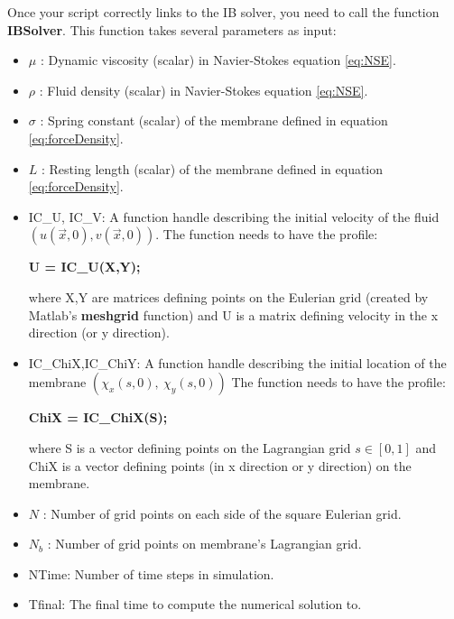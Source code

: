 \documentclass{article}
\begin{document}
Once your script correctly links to the IB solver, you need to call the function {\bf IBSolver}. This function takes several parameters as input:
\begin{itemize}
\item $\mu$ : Dynamic viscosity (scalar) in Navier-Stokes equation \eqref{eq:NSE}.
\item $\rho$ : Fluid density (scalar) in Navier-Stokes equation \eqref{eq:NSE}.
\item $\sigma$ : Spring constant (scalar) of the membrane defined in equation \eqref{eq:forceDensity}.
\item $L$ : Resting length (scalar) of the membrane defined in equation \eqref{eq:forceDensity}.

\item IC\_U, IC\_V: A function handle describing the initial velocity of the fluid $(u(\vec{x},0),v(\vec{x},0))$.
						The function needs to have the profile:\\
						\begin{center}{\bf U = IC\_U(X,Y);}\end{center}
						where X,Y are matrices defining points on the Eulerian grid (created by Matlab's {\bf meshgrid} function) and
						U is a matrix defining velocity in the x direction (or y direction).
\item IC\_ChiX,IC\_ChiY: A function handle describing the initial location of the membrane $(\chi_x(s,0),~\chi_y(s,0))$
							The function needs to have the profile:\\
							\begin{center}{\bf ChiX = IC\_ChiX(S);}\end{center}
							where S is a vector defining points on the Lagrangian grid $s\in[0,1]$ and
							ChiX is a vector defining points (in x direction or y direction) on the membrane.
							
\item $N$ : Number of grid points on each side of the square Eulerian grid.
\item $N_b$ : Number of grid points on membrane's Lagrangian grid.
\item NTime: Number of time steps in simulation.
\item Tfinal: The final time to compute the numerical solution to.


\end{itemize}
\end{document}
